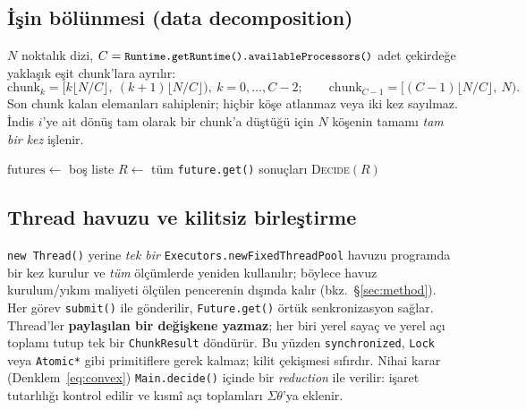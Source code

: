 \documentclass[11pt,a4paper]{article}
\newcommand{\code}[1]{\texttt{\small #1}}
\begin{document}
\subsection{İşin bölünmesi (data decomposition)}
$N$ noktalık dizi, $C=\code{Runtime.getRuntime().availableProcessors()}$ adet çekirdeğe
yaklaşık eşit chunk'lara ayrılır:
\begin{equation}
\text{chunk}_k=\big[k\lfloor N/C\rfloor,\ (k{+}1)\lfloor N/C\rfloor\big),\ k=0,\dots,C{-}2;
\qquad \text{chunk}_{C-1}=\big[(C{-}1)\lfloor N/C\rfloor,\ N\big).
\end{equation}
Son chunk kalan elemanları sahiplenir; hiçbir köşe atlanmaz veya iki kez sayılmaz. İndis $i$'ye
ait dönüş tam olarak bir chunk'a düştüğü için $N$ köşenin tamamı \emph{tam bir kez} işlenir.

\begin{algorithm}[t]
\DontPrintSemicolon
{}
$\mathrm{futures}\leftarrow$ boş liste\;
$R\leftarrow$ tüm \texttt{future.get()} sonuçları
\Return \textsc{Decide}$(R)$\;
\BlankLine
{}
\caption{Paralel Konvekslik Kontrolü (decomposition + reduction)}
\label{alg:main}
\end{algorithm}

\subsection{Thread havuzu ve kilitsiz birleştirme}
\code{new Thread()} yerine \emph{tek bir} \code{Executors.newFixedThreadPool} havuzu programda bir
kez kurulur ve \emph{tüm} ölçümlerde yeniden kullanılır; böylece havuz kurulum/yıkım maliyeti
ölçülen pencerenin dışında kalır (bkz.\ \S\ref{sec:method}). Her görev \code{submit()} ile
gönderilir, \code{Future.get()} örtük senkronizasyon sağlar. Thread'ler \textbf{paylaşılan bir
değişkene yazmaz}; her biri yerel sayaç ve yerel açı toplamı tutup tek bir \code{ChunkResult}
döndürür. Bu yüzden \code{synchronized}, \code{Lock} veya \code{Atomic*} gibi primitiflere gerek
kalmaz; kilit çekişmesi sıfırdır. Nihai karar (Denklem~\ref{eq:convex}) \code{Main.decide()}
içinde bir \emph{reduction} ile verilir: işaret tutarlılığı kontrol edilir ve kısmî açı
toplamları $\Sigma\theta$'ya eklenir.
\end{document}
